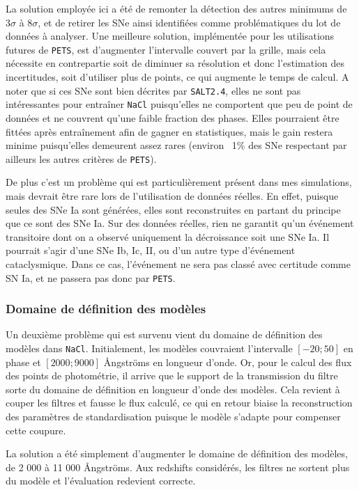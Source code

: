 \documentclass{book}
\def\pets{\texttt{PETS}\xspace}
\def\nacl{\texttt{NaCl}\xspace}
\def\saltd{\texttt{SALT2.4}\xspace}
\begin{document}
La solution employée ici a été de remonter la détection des autres minimums de $3\sigma$ à $8\sigma$, et de retirer les SNe ainsi identifiées comme problématiques du lot de données à analyser. Une meilleure solution, implémentée pour les utilisations futures de \pets, est d'augmenter l'intervalle couvert par la grille, mais cela nécessite en contrepartie soit de diminuer sa résolution et donc l'estimation des incertitudes, soit d'utiliser plus de points, ce qui augmente le temps de calcul. A noter que si ces SNe sont bien décrites par \saltd, elles ne sont pas intéressantes pour entraîner \nacl puisqu'elles ne comportent que peu de point de données et ne couvrent qu'une faible fraction des phases. Elles pourraient être fittées après entraînement afin de gagner en statistiques, mais le gain restera minime puisqu'elles demeurent assez rares (environ ~1\% des SNe respectant par ailleurs les autres critères de \pets).

De plus c'est un problème qui est particulièrement présent dans mes simulations, mais devrait être rare lors de l'utilisation de données réelles. En effet, puisque seules des SNe Ia sont générées, elles sont reconstruites en partant du principe que ce sont des SNe Ia. Sur des données réelles, rien ne garantit qu'un événement transitoire dont on a observé uniquement la décroissance soit une SNe Ia. Il pourrait s'agir d'une SNe Ib, Ic, II, ou d'un autre type d'événement cataclysmique. Dans ce cas, l'événement ne sera pas classé avec certitude comme SN Ia, et ne passera pas donc par \pets.
 

\subsubsection{Domaine de définition des modèles}

Un deuxième problème qui est survenu vient du domaine de définition des modèles dans \nacl. Initialement, les modèles couvraient l'intervalle $[-20; 50]$ en phase et $[2000; 9000]$ Ångströms en longueur d'onde. Or, pour le calcul des flux des points de photométrie, il arrive que le support de la transmission du filtre sorte du domaine de définition en longueur d'onde des modèles. Cela revient à couper les filtres et fausse le flux calculé, ce qui en retour biaise la reconstruction des paramètres de standardisation puisque le modèle s'adapte pour compenser cette coupure.

La solution a été simplement d'augmenter le domaine de définition des modèles, de 2 000 à 11 000 Ångströms. Aux redshifts considérés, les filtres ne sortent plus du modèle et l'évaluation redevient correcte.
\end{document}
